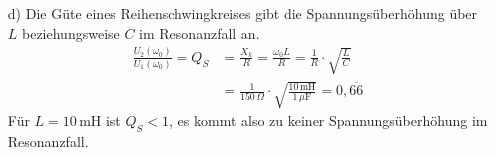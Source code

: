 {\begin{itemize}
    Die zugehörigen Werte sind:\\
    \begin{tabular}{cccccccc}
    \toprule
        $\omega$ & $0$ & $100\,\mathrm{s}^{-1}$ & $2000\,\mathrm{s}^{-1}$ & $3500\,\mathrm{s}^{-1}$ & $\omega_0$ & $10000\,\mathrm{s}^{-1}$ & $\omega\to\infty$\\
    \midrule
        $A(\omega)$ & $1,000$ & $1,009$ & $1,033$ & $1,087$ & $0,943$ & $0,555$ & $0$ \\
    \bottomrule
    \end{tabular}    
    \item[d)] Die Güte eines Reihenschwingkreises gibt die Spannungsüberhöhung über $L$ beziehungsweise $C$ 
    im Resonanzfall an. 
    \begin{align*}
        \frac{U_2(\omega_0)}{U_1(\omega_0)} = Q_S &= \frac{X_k}{R} = \frac{\omega_0 L}{R} = \frac{1}{R}\cdot\sqrt{\frac{L}{C}}\\
        &= \frac{1}{150\,\Omega}\cdot\sqrt{\frac{10\,\mathrm{mH}}{1\,\mu\mathrm{F}}}= 0,\overline{66} %
    \end{align*}
    Für $L=10\,\mathrm{mH}$ ist $Q_S < 1$, es kommt also zu keiner Spannungsüberhöhung im Resonanzfall.
\end{itemize}
}      


